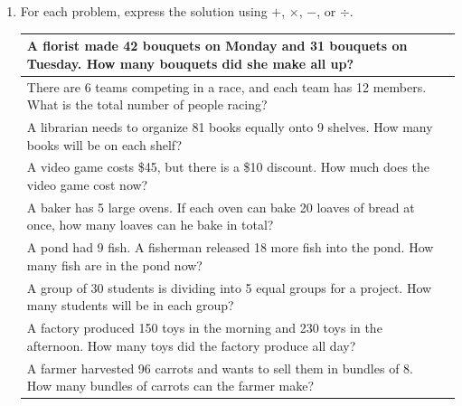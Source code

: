\documentclass{tufte-book}
\providecommand{\tabularnewline}{\\}
\begin{document}
\begin{enumerate}
\item For each problem, express the solution using $+$, $\times$, $-$, or $\div$.\par\bigskip
\begin{fullwidth}
  \begin{tabular}{>{}p{}>{\centering}b{}}
    \toprule
    {A florist made 42 bouquets on Monday and 31 bouquets on Tuesday. How many bouquets did she make all up?} & \tabularnewline
    \midrule
    {There are 6 teams competing in a race, and each team has 12 members. What is the total number of people racing?} & \tabularnewline
    \midrule
    {A librarian needs to organize 81 books equally onto 9 shelves. How many books will be on each shelf?} & \tabularnewline
    \midrule
    {A video game costs \$45, but there is a \$10 discount. How much does the video game cost now?} & \tabularnewline
    \midrule
    {A baker has 5 large ovens. If each oven can bake 20 loaves of bread at once, how many loaves can he bake in total?} & \tabularnewline
    \midrule
    {A pond had 9 fish. A fisherman released 18 more fish into the pond. How many fish are in the pond now?} & \tabularnewline
    \midrule
    {A group of 30 students is dividing into 5 equal groups for a project. How many students will be in each group?} & \tabularnewline
    \midrule
    {A factory produced 150 toys in the morning and 230 toys in the afternoon. How many toys did the factory produce all day?} & \tabularnewline
    \midrule
    {A farmer harvested 96 carrots and wants to sell them in bundles of 8. How many bundles of carrots can the farmer make?} & \tabularnewline
    \bottomrule
  \end{tabular}
\end{fullwidth}

\end{enumerate}
\end{document}
